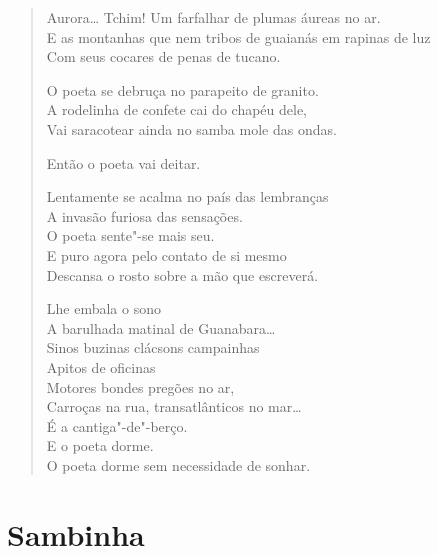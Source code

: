 \begin{verse}
Aurora\ldots{} Tchim! Um farfalhar de plumas áureas no ar.\\
E as montanhas que nem tribos de guaianás em rapinas de luz\\
Com seus cocares de penas de tucano.

O poeta se debruça no parapeito de granito.\\
A rodelinha de confete cai do chapéu dele,\\
Vai saracotear ainda no samba mole das ondas.

Então o poeta vai deitar.

Lentamente se acalma no país das lembranças\\
A invasão furiosa das sensações.\\
O poeta sente"-se mais seu.\\
E puro agora pelo contato de si mesmo\\
Descansa o rosto sobre a mão que escreverá.

Lhe embala o sono\\
A barulhada matinal de Guanabara\ldots{}\\
Sinos buzinas clácsons campainhas\\
Apitos de oficinas\\
Motores bondes pregões no ar,\\
Carroças na rua, transatlânticos no mar\ldots{}\\
É a cantiga"-de"-berço.\\
E o poeta dorme.\\

O poeta dorme sem necessidade de sonhar.
\end{verse}

\chapter{Sambinha}



